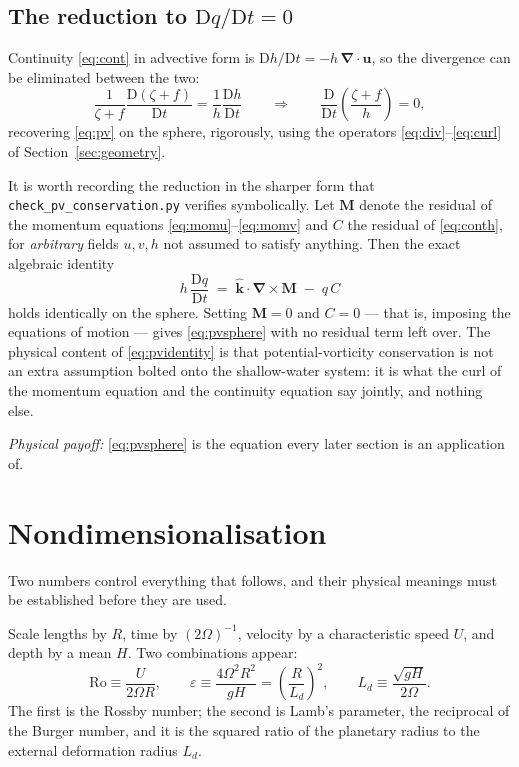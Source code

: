 \documentclass[11pt,a4paper]{article}
\newcommand{\file}[1]{\texttt{\nolinkurl{#1}}}
\newcommand{\D}{\mathrm{D}}
\newcommand{\uvec}{\boldsymbol{u}}
\newcommand{\kvec}{\hat{\boldsymbol{k}}}
\newcommand{\grad}{\boldsymbol{\nabla}}
\newcommand{\Ro}{\mathrm{Ro}}
\begin{document}
\subsection{The reduction to $\D q/\D t = 0$}

Continuity \eqref{eq:cont} in advective form is
$\D h/\D t = -h\,\grad\!\cdot\uvec$, so the divergence can be eliminated between
the two:
%
\begin{equation}
\frac{1}{\zeta+f}\frac{\D(\zeta+f)}{\D t} = \frac{1}{h}\frac{\D h}{\D t}
\qquad\Longrightarrow\qquad
\frac{\D}{\D t}\!\left(\frac{\zeta+f}{h}\right) = 0 ,
\label{eq:pvsphere}
\end{equation}
%
recovering \eqref{eq:pv} on the sphere, rigorously, using the operators
\eqref{eq:div}--\eqref{eq:curl} of Section~\ref{sec:geometry}.

It is worth recording the reduction in the sharper form that
\file{check_pv_conservation.py} verifies symbolically. Let $\boldsymbol{M}$
denote the residual of the momentum equations \eqref{eq:momu}--\eqref{eq:momv}
and $C$ the residual of \eqref{eq:conth}, for \emph{arbitrary} fields $u,v,h$
not assumed to satisfy anything. Then the exact algebraic identity
%
\begin{equation}
h\,\frac{\D q}{\D t}
 \;=\; \kvec\cdot\grad\!\times\boldsymbol{M} \;-\; q\,C
\label{eq:pvidentity}
\end{equation}
%
holds identically on the sphere. Setting $\boldsymbol{M}=0$ and $C=0$ --- that
is, imposing the equations of motion --- gives \eqref{eq:pvsphere} with no
residual term left over. The physical content of \eqref{eq:pvidentity} is that
potential-vorticity conservation is not an extra assumption bolted onto the
shallow-water system: it is what the curl of the momentum equation and the
continuity equation say jointly, and nothing else.

\medskip
\noindent\emph{Physical payoff:} \eqref{eq:pvsphere} is the equation every later
section is an application of.

\section{Nondimensionalisation}
\label{sec:nondim}

Two numbers control everything that follows, and their physical meanings must be
established before they are used.

Scale lengths by $R$, time by $(2\Omega)^{-1}$, velocity by a characteristic
speed $U$, and depth by a mean $H$. Two combinations appear:
%
\begin{equation}
\Ro \equiv \frac{U}{2\Omega R} ,
\qquad
\varepsilon \equiv \frac{4\Omega^2R^2}{gH} = \left(\frac{R}{L_d}\right)^{\!2} ,
\qquad
L_d \equiv \frac{\sqrt{gH}}{2\Omega} .
\label{eq:numbers}
\end{equation}
%
The first is the Rossby number; the second is Lamb's parameter, the reciprocal
of the Burger number, and it is the squared ratio of the planetary radius to the
external deformation radius $L_d$.
\end{document}
